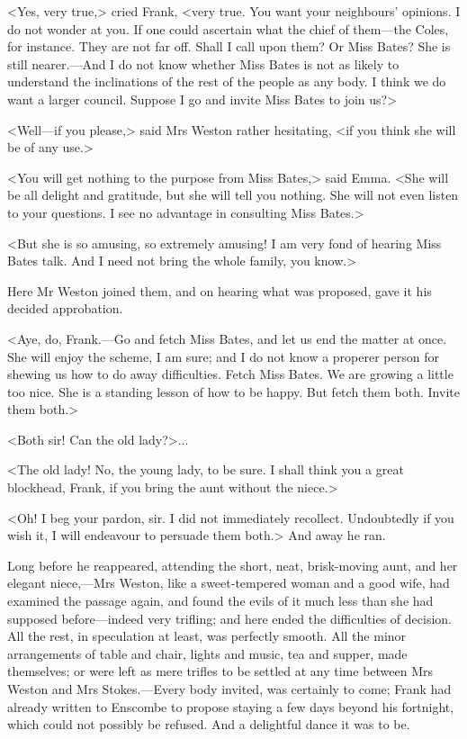 <Yes, very true,> cried Frank, <very true. You want your neighbours' opinions. I do not wonder at you. If one could ascertain what the chief of them—the Coles, for instance. They are not far off. Shall I call upon them? Or Miss Bates? She is still nearer.—And I do not know whether Miss Bates is not as likely to understand the inclinations of the rest of the people as any body. I think we do want a larger council. Suppose I go and invite Miss Bates to join us?>

<Well—if you please,> said Mrs Weston rather hesitating, <if you think she will be of any use.>

<You will get nothing to the purpose from Miss Bates,> said Emma. <She will be all delight and gratitude, but she will tell you nothing. She will not even listen to your questions. I see no advantage in consulting Miss Bates.>

<But she is so amusing, so extremely amusing! I am very fond of hearing Miss Bates talk. And I need not bring the whole family, you know.>

Here Mr Weston joined them, and on hearing what was proposed, gave it his decided approbation.

<Aye, do, Frank.—Go and fetch Miss Bates, and let us end the matter at once. She will enjoy the scheme, I am sure; and I do not know a properer person for shewing us how to do away difficulties. Fetch Miss Bates. We are growing a little too nice. She is a standing lesson of how to be happy. But fetch them both. Invite them both.>

<Both sir! Can the old lady?>...

<The old lady! No, the young lady, to be sure. I shall think you a great blockhead, Frank, if you bring the aunt without the niece.>

<Oh! I beg your pardon, sir. I did not immediately recollect. Undoubtedly if you wish it, I will endeavour to persuade them both.> And away he ran.

Long before he reappeared, attending the short, neat, brisk-moving aunt, and her elegant niece,—Mrs Weston, like a sweet-tempered woman and a good wife, had examined the passage again, and found the evils of it much less than she had supposed before—indeed very trifling; and here ended the difficulties of decision. All the rest, in speculation at least, was perfectly smooth. All the minor arrangements of table and chair, lights and music, tea and supper, made themselves; or were left as mere trifles to be settled at any time between Mrs Weston and Mrs Stokes.—Every body invited, was certainly to come; Frank had already written to Enscombe to propose staying a few days beyond his fortnight, which could not possibly be refused. And a delightful dance it was to be.

